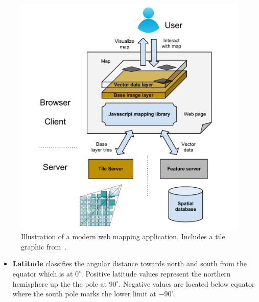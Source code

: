 \begin{figure}[h]
  \begin{center}
    \includegraphics[width=1\textwidth]{figures/web_mapping_stack.pdf}
    \caption{Illustration of a modern web mapping application. Includes a tile graphic from~\cite{web:cubeservtiles}.}
    \label{fig:web-mapping-stack}
  \end{center}
\end{figure}


\begin{itemize}

\item \textbf{Latitude} classifies the angular distance towards north and south from the equator which is at $0^\circ$. Positive latitude values represent the northern hemisphere up the the pole at $90^\circ$. Negative values are located below equator where the south pole marks the lower limit at $-90^\circ$.


\end{itemize}


\cite{Miler10webis}











